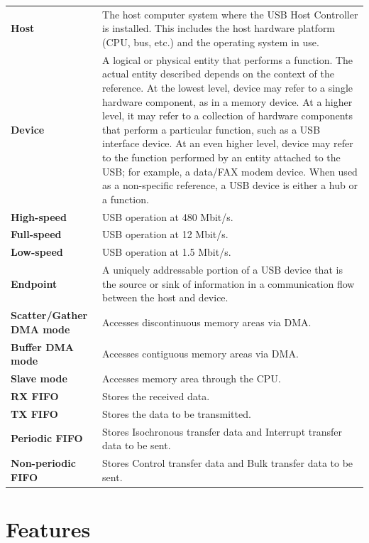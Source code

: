 \documentclass[main\_\_EN.tex]{subfiles}
\begin{document}
\begin{longtable}[c]{ R{5cm} p{10cm} }
\textbf{Host}     & The host computer system where the USB Host Controller is installed. This includes the host hardware platform (CPU, bus, etc.) and the operating system in use.\\
\textbf{Device}   & A logical or physical entity that performs a function. The actual entity described depends on the context of the reference. At the lowest level, device may refer to a single hardware component, as in a memory device. At a higher level, it may refer to a collection of hardware components that perform a particular function, such as a USB interface device. At an even higher level, device may refer to the function performed by an entity attached to the USB; for example, a data/FAX modem device. When used as a non-specific reference, a USB device is either a hub or a function.\\
\textbf{High-speed}       & USB operation at 480 Mbit/s.\\
\textbf{Full-speed}  & USB operation at 12 Mbit/s.\\
\textbf{Low-speed} & USB operation at 1.5 Mbit/s.\\
\textbf{Endpoint} & A uniquely addressable portion of a USB device that is the source or sink of information in a communication flow between the host and device.\\
\textbf{Scatter/Gather DMA mode} & Accesses discontinuous memory areas via DMA. \\
\textbf{Buffer DMA mode} & Accesses contiguous memory areas via DMA.\\
\textbf{Slave mode} & Accesses memory area through the CPU. \\
\textbf{RX FIFO} & Stores the received data.\\
\textbf{TX FIFO} & Stores the data to be transmitted.\\
\textbf{Periodic FIFO} & Stores Isochronous transfer data and Interrupt transfer data to be sent.\\
\textbf{Non-periodic FIFO} & Stores Control transfer data and Bulk transfer data to be sent.\\
\end{longtable}

\section{Features}
\end{document}
